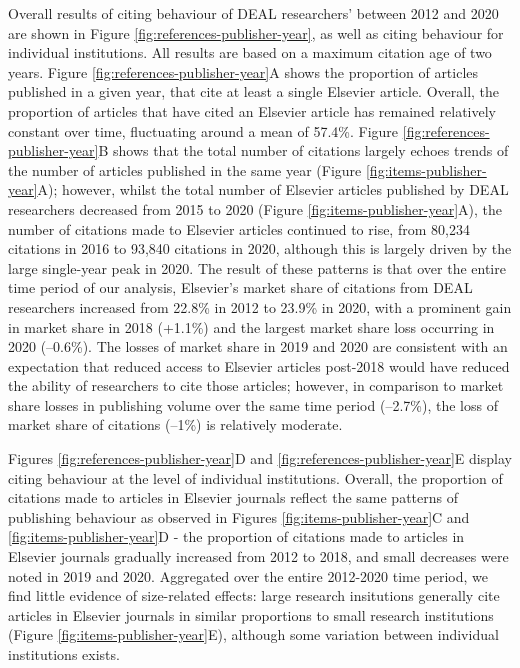 \documentclass[
]{article}
\begin{document}
Overall results of citing behaviour of DEAL researchers' between 2012 and 2020 are shown in Figure \ref{fig:references-publisher-year}, as well as citing behaviour for individual institutions. All results are based on a maximum citation age of two years. Figure \ref{fig:references-publisher-year}A shows the proportion of articles published in a given year, that cite at least a single Elsevier article. Overall, the proportion of articles that have cited an Elsevier article has remained relatively constant over time, fluctuating around a mean of 57.4\%. Figure \ref{fig:references-publisher-year}B shows that the total number of citations largely echoes trends of the number of articles published in the same year (Figure \ref{fig:items-publisher-year}A); however, whilst the total number of Elsevier articles published by DEAL researchers decreased from 2015 to 2020 (Figure \ref{fig:items-publisher-year}A), the number of citations made to Elsevier articles continued to rise, from 80,234 citations in 2016 to 93,840 citations in 2020, although this is largely driven by the large single-year peak in 2020. The result of these patterns is that over the entire time period of our analysis, Elsevier's market share of citations from DEAL researchers increased from 22.8\% in 2012 to 23.9\% in 2020, with a prominent gain in market share in 2018 (+1.1\%) and the largest market share loss occurring in 2020 (--0.6\%). The losses of market share in 2019 and 2020 are consistent with an expectation that reduced access to Elsevier articles post-2018 would have reduced the ability of researchers to cite those articles; however, in comparison to market share losses in publishing volume over the same time period (--2.7\%), the loss of market share of citations (--1\%) is relatively moderate.

Figures \ref{fig:references-publisher-year}D and \ref{fig:references-publisher-year}E display citing behaviour at the level of individual institutions. Overall, the proportion of citations made to articles in Elsevier journals reflect the same patterns of publishing behaviour as observed in Figures \ref{fig:items-publisher-year}C and \ref{fig:items-publisher-year}D - the proportion of citations made to articles in Elsevier journals gradually increased from 2012 to 2018, and small decreases were noted in 2019 and 2020. Aggregated over the entire 2012-2020 time period, we find little evidence of size-related effects: large research insitutions generally cite articles in Elsevier journals in similar proportions to small research institutions (Figure \ref{fig:items-publisher-year}E), although some variation between individual institutions exists.
\end{document}
